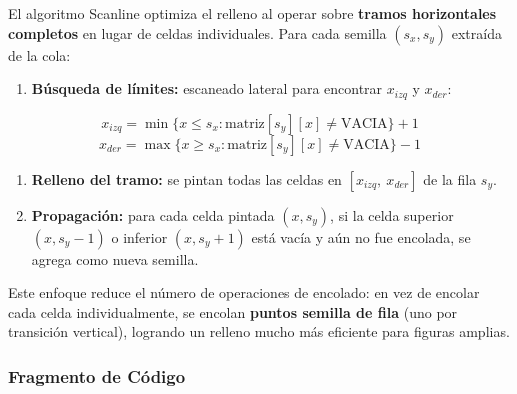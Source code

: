 \documentclass[
  spanish,
  a4paper,
  12pt,
]{article}
\providecommand{\tightlist}{%
  \setlength{\itemsep}{0pt}\setlength{\parskip}{0pt}}
\begin{document}
El algoritmo Scanline optimiza el relleno al operar sobre \textbf{tramos
horizontales completos} en lugar de celdas individuales. Para cada
semilla \((s_x, s_y)\) extraída de la cola:

\begin{enumerate}
\def\labelenumi{\arabic{enumi}.}
\tightlist
\item
  \textbf{Búsqueda de límites:} escaneado lateral para encontrar
  \(x_{izq}\) y \(x_{der}\):
\end{enumerate}

\[x_{izq} = \min\{x \leq s_x : \text{matriz}[s_y][x] \neq \text{VACIA}\} + 1\]
\[x_{der} = \max\{x \geq s_x : \text{matriz}[s_y][x] \neq \text{VACIA}\} - 1\]

\begin{enumerate}
\def\labelenumi{\arabic{enumi}.}
\setcounter{enumi}{1}
\item
  \textbf{Relleno del tramo:} se pintan todas las celdas en
  \([x_{izq},\ x_{der}]\) de la fila \(s_y\).
\item
  \textbf{Propagación:} para cada celda pintada \((x, s_y)\), si la
  celda superior \((x, s_y-1)\) o inferior \((x, s_y+1)\) está vacía y
  aún no fue encolada, se agrega como nueva semilla.
\end{enumerate}

Este enfoque reduce el número de operaciones de encolado: en vez de
encolar cada celda individualmente, se encolan \textbf{puntos semilla de
fila} (uno por transición vertical), logrando un relleno mucho más
eficiente para figuras amplias.

\newpage

\subsubsection{Fragmento de Código}\label{fragmento-de-cuxf3digo-8}
\end{document}
